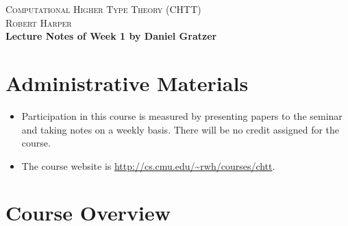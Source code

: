 \documentclass{article}
\begin{document}
\begin{center}
\Large{\scshape Computational Higher Type Theory (CHTT)}\\[2pt]
\large{\scshape Robert Harper}\\[4pt]
\large\bfseries{Lecture Notes of Week 1 by Daniel Gratzer}
\end{center}

\bigskip



\section{Administrative Materials}

\begin{itemize}
\item Participation in this course is measured by presenting papers to
  the seminar and taking notes on a weekly basis. There
  will be no credit assigned for the course.
\item The course website is \url{http://cs.cmu.edu/~rwh/courses/chtt}.
\end{itemize}

\section{Course Overview}
\end{document}
